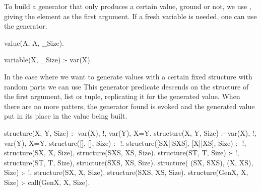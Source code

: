 To build a generator that only produces a certain value, ground or not,
we use , giving the element as the first argument.
%
If a fresh variable is needed, one can use the 
generator.
\begin{yapcode}
 value(A, A, _Size).

 variable(X, _Size) :- var(X).
\end{yapcode}
%
In the case where we want to generate values with a certain fixed
structure with random parts we can use 
%
This generator predicate descends on the structure of the first
argument, list or tuple, replicating it for the generated value.
%
When there are no more patters, the generator found is evoked and the
generated value put in its place in the value being built.
%
\begin{yapcode}
 structure(X, Y, Size) :-
   var(X), !, var(Y), X=Y.
 structure(X, Y, Size) :-
   var(X), !, var(Y), X=Y.
 structure([], [], Size) :- !.
 structure([SX||SXS], [X||XS], Size) :-
   !,
   structure(SX, X, Size),
   structure(SXS, XS, Size).
 structure({ST}, {T}, Size) :-
   !,
   structure(ST, T, Size),
   structure(SXS, XS, Size).
 structure( (SX, SXS), (X, XS), Size) :-
   !,
   structure(SX, X, Size),
   structure(SXS, XS, Size).
 structure(GenX, X, Size) :-
   call(GenX, X, Size).
\end{yapcode}



\begin{yapcode}
\end{yapcode}

\begin{yapcode}
\end{yapcode}
\begin{yapcode}
\end{yapcode}

